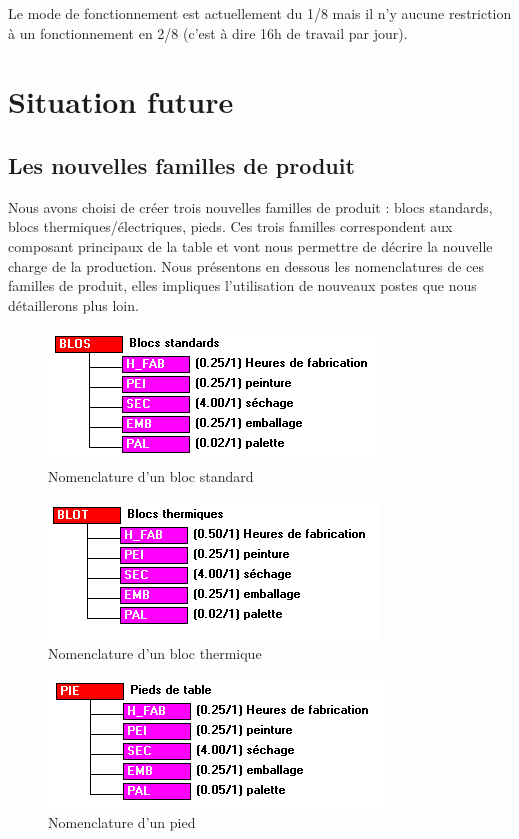 \documentclass[a4paper]{../TPInsa}
\begin{document}
	Le mode de fonctionnement est actuellement du 1/8 mais il n'y aucune restriction à un fonctionnement en 2/8 (c'est à dire 16h de travail par jour).
	\section{Situation future}
	
	\subsection{Les nouvelles familles de produit}
	Nous avons choisi de créer trois nouvelles familles de produit : blocs standards, blocs thermiques/électriques, pieds. Ces trois familles correspondent aux composant principaux de la table et vont nous permettre de décrire la nouvelle charge de la production. 
	Nous présentons en dessous les nomenclatures de ces familles de produit, elles impliques l'utilisation de nouveaux postes que nous détaillerons plus loin. 
	
	\begin{figure}[H]
	\centering
	\includegraphics[scale=0.8]{captures/standard.PNG}
	\caption{Nomenclature d'un bloc standard}
	\end{figure}
	
	\begin{figure}[H]
	\centering
	\includegraphics[scale=0.8]{captures/thermique.PNG}
	\caption{Nomenclature d'un bloc thermique}
	\end{figure}

	\begin{figure}[H]
	\centering
	\includegraphics[scale=0.8]{captures/pied.PNG}
	\caption{Nomenclature d'un pied}
	\end{figure}
	
\end{document}
